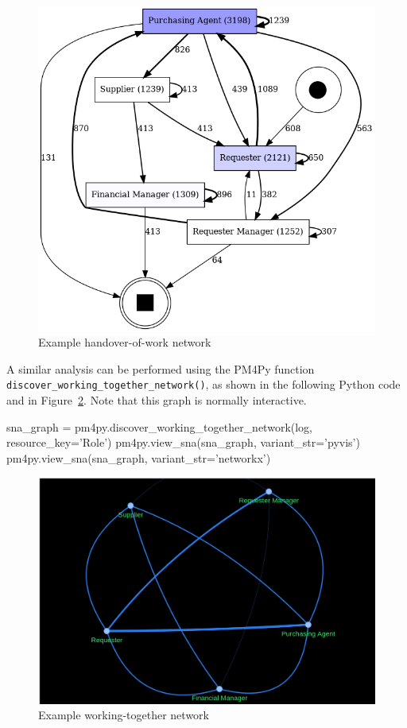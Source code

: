 \begin{figure}
\centering
\includegraphics[width=.66\textwidth]{handover.png}
\caption{Example handover-of-work network}
\label{fig:handover}
\end{figure}

A similar analysis can be performed using the PM4Py function \\ \texttt{discover\_working\_together\_network()}, as shown in the following Python code and in Figure~\ref{fig:workingtogether}. Note that this graph is normally interactive.

\begin{samepage}
\begin{pythoncode}
sna_graph = pm4py.discover_working_together_network(log,
   resource_key='Role')
pm4py.view_sna(sna_graph, variant_str='pyvis')   
pm4py.view_sna(sna_graph, variant_str='networkx')   
\end{pythoncode}
\end{samepage}

\begin{figure}
\centering
\includegraphics[width=.66\textwidth]{screen4.png}
\caption{Example working-together network}
\label{fig:workingtogether}
\end{figure}


